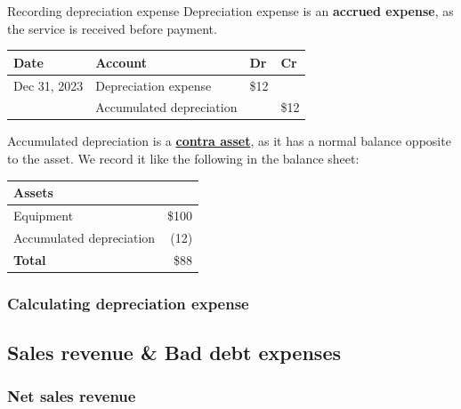 \begin{knBox}
    {Recording depreciation expense}
    Depreciation expense is an \textbf{accrued expense}, as the service is received before payment.

    \vspace{1em}
    \begin{tabular}{llll}
        \textbf{Date} & \textbf{Account}      & \textbf{Dr} & \textbf{Cr} \\
        \hline
        Dec 31, 2023  & Depreciation expense  & \$12        &             \\
                      & \quad Accumulated depreciation &             & \$12         \\
    \end{tabular}

    \vspace{1em}
    
    Accumulated depreciation is a \hyperref[def:contra]{\textbf{contra asset}}, as it has a normal balance opposite to the asset. We record it like the following in the balance sheet:
    
    \vspace{1em}    

    \begin{tabular}{lr}
            \textbf{Assets} &  \\
            \hline
            Equipment       & \$100          \\
            \quad Accumulated depreciation & (12)               \\
            \hline
            \textbf{Total}   & \$88           \\
        \end{tabular}
\end{knBox}

\subsubsection{Calculating depreciation expense}


\subsection{Sales revenue \& Bad debt expenses}

\subsubsection{Net sales revenue}

